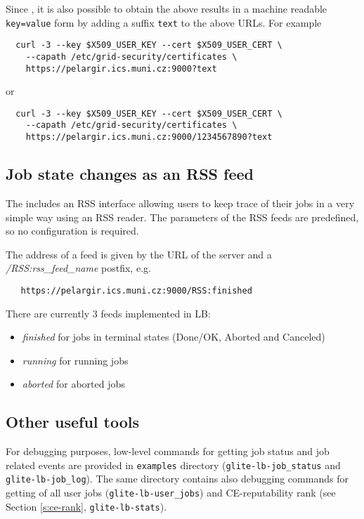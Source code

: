Since , it is also possible to obtain the above results in a machine readable 
\verb'key=value' form by adding a suffix \verb'text' to the above URLs. For example
\begin{verbatim}
  curl -3 --key $X509_USER_KEY --cert $X509_USER_CERT \
    --capath /etc/grid-security/certificates \ 
    https://pelargir.ics.muni.cz:9000?text
\end{verbatim}
or
\begin{verbatim}
  curl -3 --key $X509_USER_KEY --cert $X509_USER_CERT \
    --capath /etc/grid-security/certificates \ 
    https://pelargir.ics.muni.cz:9000/1234567890?text
\end{verbatim}

\subsection{Job state changes as an RSS feed}
The \LB includes an RSS interface allowing users to keep trace of their jobs in a very simple way using an RSS reader. The parameters of the RSS feeds are predefined, so no configuration is required.

The address of a feed is given by the URL of the \LB server and a \textit{/RSS:rss\_feed\_name} postfix, e.g.
\begin{verbatim}
   https://pelargir.ics.muni.cz:9000/RSS:finished
\end{verbatim}  

There are currently 3 feeds implemented in LB:
\begin{itemize}
 \item \textit{finished} for jobs in terminal states (Done/OK, Aborted and Canceled)
 \item \textit{running} for running jobs
 \item \textit{aborted} for aborted jobs
\end{itemize}

\subsection{Other useful tools}

For debugging purposes, low-level commands for getting \LB job status and job related events are provided in 
\verb'examples' directory (\verb'glite-lb-job_status' and \verb'glite-lb-job_log'). The same directory
contains also debugging commands for getting of all user jobs (\verb'glite-lb-user_jobs') and
CE-reputability rank (see Section \ref{s:ce-rank}, \verb'glite-lb-stats').

